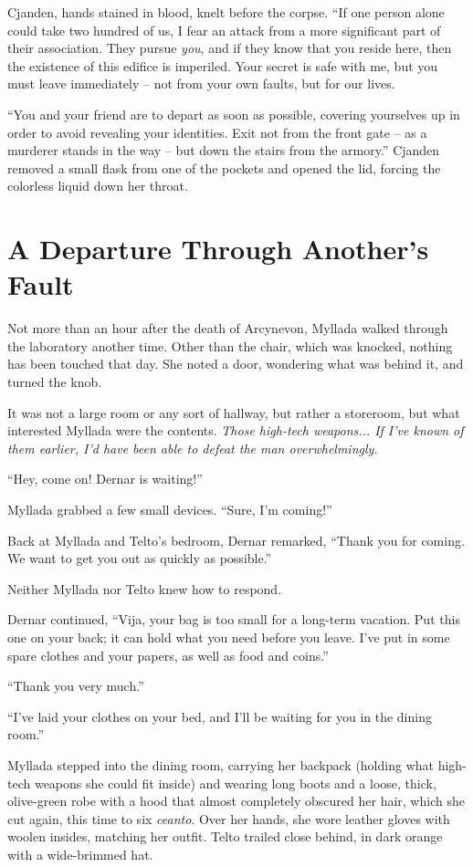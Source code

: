 Cjanden, hands stained in blood, knelt before the corpse. ``If one person alone could take two hundred of us, I fear an attack from a more significant part of their association.  They pursue \emph{you}, and if they know that you reside here, then the existence of this edifice is imperiled. Your secret is safe with me, but you must leave immediately -- not from your own faults, but for our lives.

``You and your friend are to depart as soon as possible, covering yourselves up in order to avoid revealing your identities. Exit not from the front gate -- as a murderer stands in the way -- but down the stairs from the armory.'' Cjanden removed a small flask from one of the pockets and opened the lid, forcing the colorless liquid down her throat.

\chapter{A Departure Through Another's Fault}

Not more than an hour after the death of Arcynevon, Myllada walked through the laboratory another time. Other than the chair, which was knocked, nothing has been touched that day. She noted a door, wondering what was behind it, and turned the knob.

It was not a large room or any sort of hallway, but rather a storeroom, but what interested Myllada were the contents. \emph{Those high-tech weapons... If I've known of them earlier, I'd have been able to defeat the man overwhelmingly.}

``Hey, come on! Dernar is waiting!''

Myllada grabbed a few small devices. ``Sure, I'm coming!''

Back at Myllada and Telto's bedroom, Dernar remarked, ``Thank you for coming. We want to get you out as quickly as possible.''

Neither Myllada nor Telto knew how to respond.

Dernar continued, ``Vija, your bag is too small for a long-term vacation. Put this one on your back; it can hold what you need before you leave. I've put in some spare clothes and your papers, as well as food and coins.''

``Thank you very much.''

``I've laid your clothes on your bed, and I'll be waiting for you in the dining room.''

\centeredstars

Myllada stepped into the dining room, carrying her backpack (holding what high-tech weapons she could fit inside) and wearing long boots and a loose, thick, olive-green robe with a hood that almost completely obscured her hair, which she cut again, this time to six \emph{ceanto}. Over her hands, she wore leather gloves with woolen insides, matching her outfit. Telto trailed close behind, in dark orange with a wide-brimmed hat.

